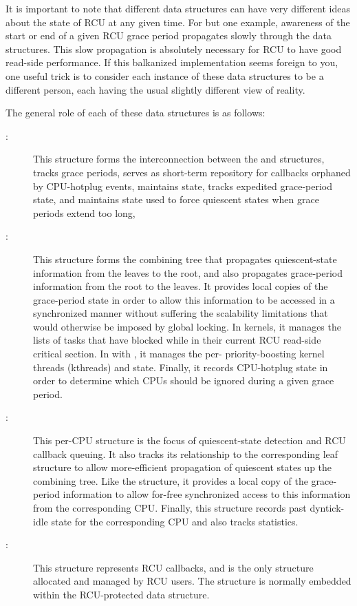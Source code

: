 It is important to note that different data structures can have very
different ideas about the state of RCU at any given time.
For but one
example, awareness of the start or end of a given RCU grace period
propagates slowly through the data structures.
This slow propagation is
absolutely necessary for RCU to have good read-side performance.
If this
balkanized implementation seems foreign to you, one useful trick is to
consider each instance of these data structures to be a different
person, each having the usual slightly different view of reality.

The general role of each of these data structures is as follows:

\begin{description}
\item[:]
   This structure forms the interconnection between the
    and  structures, tracks grace periods,
   serves as short-term repository for callbacks orphaned by CPU-hotplug
   events, maintains  state, tracks expedited
   grace-period state, and maintains state used to force quiescent
   states when grace periods extend too long,
\item[:]
   This structure forms the combining tree that propagates
   quiescent-state information from the leaves to the root, and also
   propagates grace-period information from the root to the leaves.
   It
   provides local copies of the grace-period state in order to allow
   this information to be accessed in a synchronized manner without
   suffering the scalability limitations that would otherwise be imposed
   by global locking.
   In  kernels, it manages the
   lists of tasks that have blocked while in their current RCU read-side
   critical section.
   In  with
   , it manages the per-
   priority-boosting kernel threads (kthreads) and state.
   Finally, it
   records CPU-hotplug state in order to determine which CPUs should be
   ignored during a given grace period.
\item[:]
   This per-CPU structure is the focus of quiescent-state
   detection and RCU callback queuing.
   It also tracks its relationship
   to the corresponding leaf  structure to allow
   more-efficient propagation of quiescent states up the 
   combining tree.
   Like the  structure, it provides a local
   copy of the grace-period information to allow for-free synchronized
   access to this information from the corresponding CPU\@.
   Finally, this
   structure records past dyntick-idle state for the corresponding CPU
   and also tracks statistics.
\item[:] This structure represents RCU callbacks, and is the
   only structure allocated and managed by RCU users.
   The 
   structure is normally embedded within the RCU-protected data
   structure.
\end{description}

